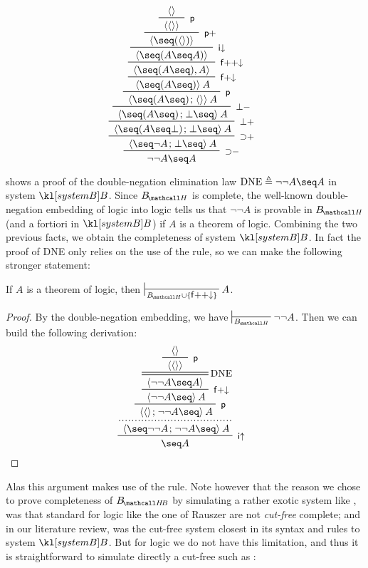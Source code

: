 \begin{marginfigure}
  $$
  \R[{\limp}{-}]
  {\R[{\limp}{+}]
  {\R[{\bot}{+}]
  {\R[{\bot}{-}]
  {\R[\rsf{p}]
  {\R[\rsf{f{+}{\da}}]
  {\R[\rsf{f{+}{+}{\da}}]
  {\R[\rsf{i{\da}}]
  {\R[\rsf{p}{+}]
  {\R[\rsf{p}]
  {{} \piq{}}
  {{} \piq{\piq{}}}}
  {{} \piq{\seq (\piq{})}}}
  {{} \piq{\seq (A \seq A)}}}
  {{} \piq{\seq (A \seq), A}}}
  {{} \piq{\seq (A \seq)} A}}
  {{} \piq{\seq (A \seq) \sep \piq{}} A}}
  {{} \piq{\seq (A \seq) \sep \bot \seq} A}}
  {{} \piq{\seq (A \seq \bot) \sep \bot \seq} A}}
  {{} \piq{\seq \neg A \sep \bot \seq} A}}
  {\neg \neg A \seq A}
  $$
  \caption{Proof of DNE in system $\sysB$}
\end{marginfigure}

 shows a proof of the double-negation elimination law
$\mathrm{DNE} \defeq \neg \neg A \seq A$ in system $\sysB$. Since $\sysBH$ is
 complete, the well-known double-negation embedding of
 logic into  logic tells us that $\neg \neg A$ is
provable in $\sysBH$ (and a fortiori in $\sysB$) if $A$ is a theorem of
 logic. Combining the two previous facts, we obtain the 
completeness of system $\sysB$. In fact the proof of DNE only relies on the use
of the  rule, so we can make the following stronger
statement:

\begin{corollary}\label{cor:bubbles-completeness-classical}
  If $A$ is a theorem of  logic, then $\prov{\sysBH \cup
  \{\rsf{f{+}{+}{\da}}\}} A$.
\end{corollary}
\begin{proof}
  By the double-negation embedding, we have $\prov{\sysBH} \neg \neg A$. Then we
  can build the following derivation:
  $$
  \R[\rsf{i{\ua}}]
  {\prftree[dotted]
  {\R[\rsf{p}]
  {\R[\rsf{f{+}{\da}}]
  {\prftree[r][d]{DNE}  
  {\R[\rsf{p}]
  {{} \piq{}}
  {{} \piq{\piq{}}}}
  {{} \piq{\neg \neg A \seq A}}}
  {{} \piq{\neg \neg A \seq} A}}
  {{} \piq{\piq{} \sep \neg \neg A \seq} A}}
  {{} \piq{\seq \neg \neg A \sep \neg \neg A \seq} A}}
  {\seq A}
  $$
\end{proof}

Alas this argument makes use of the  rule. Note however that
the reason we chose to prove completeness of $\sysBHB$ by simulating a rather
exotic system like , was that standard  for
 logic like the one of Rauszer
 are not \emph{cut-free} complete; and in
our literature review,  was the cut-free system closest in its
syntax and rules to system $\sysB$. But for  logic we do not have this
limitation, and thus it is straightforward to simulate directly a cut-free
 such as  :

